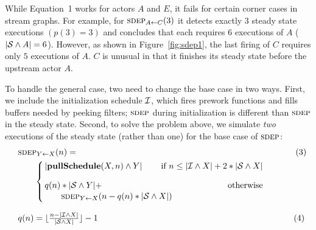 While Equation~1 works for actors $A$ and $E$, it fails for certain
corner cases in stream graphs.  For example, for $\textsc{sdep}_{A \small{\leftarrow} C}(3)$ it
detects exactly 3 steady state executions $(p(3)=3)$ and concludes
that each requires $6$ executions of $A$ ($|{\cal S} \wedge A| = 6$).
However, as shown in Figure~\ref{fig:sdep1}, the last firing of
$C$ requires only $5$ executions of $A$.  $C$ is unusual in that it
finishes its steady state before the upstream actor $A$.

To handle the general case, two need to change the base case in two
ways.  First, we include the initialization schedule ${\cal I}$, which
fires prework functions and fills buffers needed by peeking filters;
$\textsc{sdep}$ during initialization is different than $\textsc{sdep}$ in the steady
state.  Second, to solve the problem above, we simulate {\it two}
executions of the steady state (rather than one) for the base case of
$\textsc{sdep}$:
\begin{equation*}
\hspace{20pt}\begin{array}{l}
\hspace{-10pt}\sdepf{Y}{X}(n) = ~\hspace{3.1in}\hspace{28pt}(3)\\[1Ex]
\mbox{~}\hspace{6pt}
\left\{\begin{array}{lr}
\hspace{-3.5pt}|{\bf pullSchedule}(X, n) \wedge Y| & \hspace{-23pt} \mbox{if~} n \le |{\cal I} \wedge X| + 2*|{\cal S} \wedge X| \\[2.5Ex]
\hspace{-3.5pt}q(n) * |{\cal S} \wedge Y| + & \hspace{-23pt} \mbox{otherwise} \\[0.2Ex] %
\mbox{~}\hspace{12.5pt} \sdepf{Y}{X}(n - q(n) * |{\cal S} \wedge X|)
\end{array}
\right.~\\~\\
\hspace{-10pt}q(n) = \lfloor \frac{n - |{\cal I} \wedge X|}{|{\cal S} \wedge X|} \rfloor - 1  ~\hspace{2.93in}\hspace{15.3pt}(4)
\end{array}
\vspace{-2pt}
\end{equation*}
